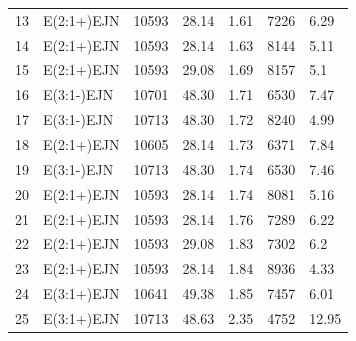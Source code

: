 \documentclass[letterpaper, preprint, paper,11pt]{AAS}	%
\begin{document}
\begin{table}[h!]
\begin{tabular}{lllllll}
    13                 & E(2:1+)EJN        & 10593                 & 28.14       & 1.61        & 7226      & 6.29          \\
    14                 & E(2:1+)EJN        & 10593                 & 28.14       & 1.63        & 8144      & 5.11          \\
    15                 & E(2:1+)EJN        & 10593                 & 29.08       & 1.69        & 8157      & 5.1           \\
    16                 & E(3:1-)EJN        & 10701                 & 48.30       & 1.71        & 6530      & 7.47          \\
    17                 & E(3:1-)EJN        & 10713                 & 48.30       & 1.72        & 8240      & 4.99          \\
    18                 & E(2:1+)EJN        & 10605                 & 28.14       & 1.73        & 6371      & 7.84          \\
    19                 & E(3:1-)EJN        & 10713                 & 48.30       & 1.74        & 6530      & 7.46          \\
    20                 & E(2:1+)EJN        & 10593                 & 28.14       & 1.74        & 8081      & 5.16          \\
    21                 & E(2:1+)EJN        & 10593                 & 28.14       & 1.76        & 7289      & 6.22          \\
    22                 & E(2:1+)EJN        & 10593                 & 29.08       & 1.83        & 7302      & 6.2           \\
    23                 & E(2:1+)EJN        & 10593                 & 28.14       & 1.84        & 8936      & 4.33          \\
    24                 & E(3:1+)EJN        & 10641                 & 49.38       & 1.85        & 7457      & 6.01          \\
    \rowcolor{lightgray}25                 & E(3:1+)EJN        & 10713                 & 48.63       & 2.35        & 4752      & 12.95         \\                                                 
    \bottomrule
    \end{tabular}
\end{table}
\fi

\clearpage
\end{document}
